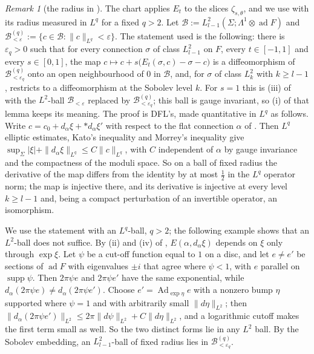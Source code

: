 \documentclass[11pt]{amsart}
\theoremstyle{definition}
\theoremstyle{remark}
\newtheorem{remark}[theorem]{Remark}
\theoremstyle{plain}
\numberwithin{equation}{section}
\newcommand{\cB}{\mathcal{B}}
\newcommand{\ad}{\operatorname{ad}}
\newcommand{\eps}{\varepsilon}
\begin{document}
\begin{remark}[the radius in {\cite[Lemma~4.1]{DFL}}]\label{rem:dfl-radius}
The chart applies $E_t$ to the slices $\zeta_{s,\theta}$, and we use
\cite[Lemma~4.1(iii)]{DFL} with its radius measured in $L^q$ for a fixed
$q>2$. Let $\cB:=L^2_{l-1}(\Sigma;\Lambda^1\otimes\ad F)$ and
$\cB^{(q)}_{<\eps}:=\{c\in\cB:\|c\|_{L^q}<\eps\}$. The statement used is the
following: there is $\eps_q>0$ such that for every connection $\sigma$ of class
$L^2_{l-1}$ on $F$, every $t\in[-1,1]$ and every $s\in[0,1]$, the map
$c\mapsto c+s\bigl(E_t(\sigma,c)-\sigma-c\bigr)$ is a diffeomorphism of
$\cB^{(q)}_{<\eps_q}$ onto an open neighbourhood of $0$ in $\cB$, and, for $\sigma$
of class $L^2_k$ with $k\ge l-1$, restricts to a diffeomorphism at the Sobolev
level $k$. For $s=1$ this is (iii) of \cite[Lemma~4.1]{DFL} with the $L^2$-ball
$\cB_{<\eps}$ replaced by $\cB^{(q)}_{<\eps_q}$; this ball is gauge invariant, so (i) of that
lemma keeps its meaning. The proof is DFL's, made quantitative in $L^q$ as follows. Write
$c=c_0+d_\alpha\xi+{*}d_\alpha\xi'$ with respect to the flat connection $\alpha$ of
\cite[Lemma~4.2]{DFL}. Then $L^q$ elliptic estimates, Kato's inequality and Morrey's
inequality give $\sup_\Sigma|\xi|+\|d_\alpha\xi\|_{L^q}\le C\|c\|_{L^q}$, with $C$ independent of
$\alpha$ by gauge invariance and the compactness of the moduli space. So on a ball of fixed radius
the derivative of the map differs from the identity by at most $\frac12$ in the $L^q$ operator
norm; the map is injective there, and its derivative is injective at every level $k\ge l-1$ and,
being a compact perturbation of an invertible operator, an isomorphism.

We use the statement with an $L^q$-ball, $q>2$; the following example shows that an
$L^2$-ball does not suffice. By (ii) and (iv) of
\cite[Lemma~4.1]{DFL}, $E(\alpha,d_\alpha\xi)$ depends on $\xi$ only through
$\exp\xi$. Let $\psi$ be a cut-off function equal to $1$ on a disc, and let
$e\ne e'$ be sections of $\ad F$ with eigenvalues $\pm i$ that agree where
$\psi<1$, with $e$ parallel on $\operatorname{supp}\psi$. Then $2\pi\psi e$ and $2\pi\psi e'$
have the same exponential, while $d_\alpha(2\pi\psi e)\ne d_\alpha(2\pi\psi e')$.
Choose $e'=\operatorname{Ad}_{\exp\eta}e$ with a nonzero bump $\eta$ supported where $\psi=1$
and with arbitrarily small $\|d\eta\|_{L^2}$; then
$\|d_\alpha(2\pi\psi e')\|_{L^2}\le2\pi\|d\psi\|_{L^2}+C\|d\eta\|_{L^2}$, and a logarithmic cutoff
makes the first term small as well. So the two distinct forms lie in any $L^2$ ball. By the
Sobolev embedding, an $L^2_{l-1}$-ball of fixed radius lies in $\cB^{(q)}_{<\eps_q}$.
\end{remark}
\end{document}
